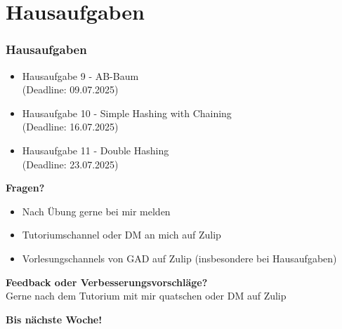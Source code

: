 \documentclass{beamer}
\begin{document}
\section{Hausaufgaben}
\begin{frame}
	\frametitle{Hausaufgaben}
	\begin{itemize}
		\item Hausaufgabe 9 - AB-Baum \\
		      (Deadline: 09.07.2025)
		\item Hausaufgabe 10 - Simple Hashing with Chaining \\
		      (Deadline: 16.07.2025)
		\item Hausaufgabe 11 - Double Hashing \\
		      (Deadline: 23.07.2025)
	\end{itemize}
\end{frame}

\begin{frame}
	\textbf{Fragen?}
	\begin{itemize}
		\item Nach Übung gerne bei mir melden
		\item Tutoriumschannel oder DM an mich auf Zulip
		\item Vorlesungschannels von GAD auf Zulip (insbesondere bei Hausaufgaben)
	\end{itemize}

	\medskip
	\textbf{Feedback oder Verbesserungsvorschläge?} \\
	Gerne nach dem Tutorium mit mir quatschen oder DM auf Zulip

	\medskip
	\textbf{Bis nächste Woche!}
\end{frame}

\end{document}

